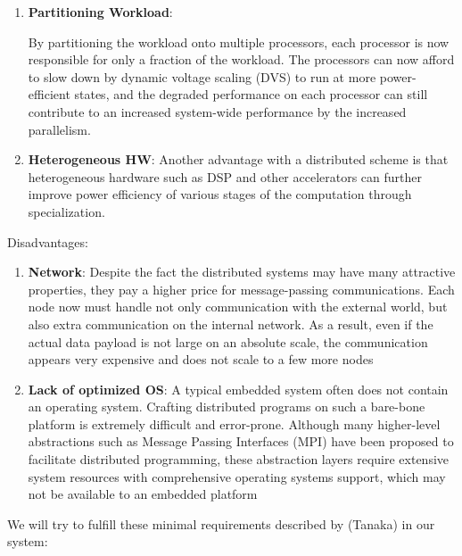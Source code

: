 \begin{enumerate}

\item \textbf{Partitioning Workload}:

By partitioning the workload onto multiple processors, each processor is now
responsible for only a fraction of the workload. The processors can now afford
to slow down by dynamic voltage scaling (DVS) to run at more power-efficient
states, and the degraded performance on each processor can still contribute to
an increased system-wide performance by the increased parallelism.

\item \textbf{Heterogeneous HW}:
Another advantage with a distributed scheme is that heterogeneous hardware such
as DSP and other accelerators can further improve power efficiency of various
stages of the computation through specialization.

\end{enumerate}


Disadvantages:

\begin{enumerate}
\item \textbf{Network}: Despite the fact the distributed systems may have
many attractive properties, they pay a higher price for message-passing
communications. Each node now must handle not only communication
with the external world, but also extra communication on the internal network.
As a result, even if the actual data payload is not large
on an absolute scale, the communication appears very expensive and
does not scale to a few more nodes

\item \textbf{Lack of optimized OS}: A typical embedded system often does
not contain an operating system. Crafting distributed programs on such a
bare-bone platform is extremely difficult and error-prone. Although many
higher-level abstractions such as Message Passing Interfaces (MPI)
have been proposed to facilitate distributed programming, these abstraction
layers require extensive system resources with comprehensive operating systems
support, which may not be available to an embedded platform
\end{enumerate}

We will try to fulfill these minimal requirements described by (Tanaka) in our
system:

